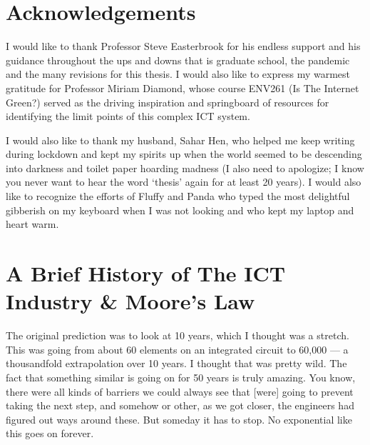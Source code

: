 \documentclass{article}
\begin{document}
\cleardoublepage
{\hypersetup{linkcolor=black}  %
\tableofcontents}

\cleardoublepage
\section*{Acknowledgements}
I would like to thank Professor Steve Easterbrook for his endless support and his guidance throughout the ups and downs that is graduate school, the pandemic and the many revisions for this thesis. I would also like to express my warmest gratitude for Professor Miriam Diamond, whose course ENV261 (Is The Internet Green?) served as the driving inspiration and springboard of resources for identifying the limit points of this complex ICT system.

I would also like to thank my husband, Sahar Hen, who helped me keep writing during lockdown and kept my spirits up when the world seemed to be descending into darkness and toilet paper hoarding madness (I also need to apologize; I know you never want to hear the word `thesis' again for at least 20 years). I would also like to recognize the efforts of Fluffy and Panda who typed the most delightful gibberish on my keyboard when I was not looking and who kept my laptop and heart warm.

\cleardoublepage
\section{A Brief History of The ICT Industry \& Moore's Law} \label{SECTION_BACKGROUND}
 \begin{fquote} 
 The original prediction was to look at 10 years, which I thought was a stretch. This was going from about 60 elements on an integrated circuit to 60,000 — a thousandfold extrapolation over 10 years. I thought that was pretty wild. The fact that something similar is going on for 50 years is truly amazing. You know, there were all kinds of barriers we could always see that [were] going to prevent taking the next step, and somehow or other, as we got closer, the engineers had figured out ways around these. But someday it has to stop. No exponential like this goes on forever.
 \end{fquote}
 
\end{document}
